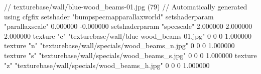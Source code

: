 // texturebase/wall/blue-wood_beams-01.jpg (79)
// Automatically generated using cfgfix
setshader "bumpspecmapparallaxworld"
setshaderparam "parallaxscale" 0.000000 -0.000000
setshaderparam "specscale" 2.000000 2.000000 2.000000
texture "c" "texturebase/wall/blue-wood_beams-01.jpg" 0 0 0 1.000000
texture "n" "texturebase/wall/specials/wood_beams_n.jpg" 0 0 0 1.000000
texture "s" "texturebase/wall/specials/wood_beams_s.jpg" 0 0 0 1.000000
texture "z" "texturebase/wall/specials/wood_beams_h.jpg" 0 0 0 1.000000
